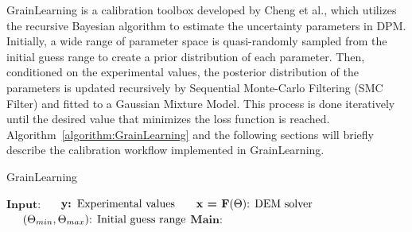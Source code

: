 GrainLearning is a calibration toolbox developed by Cheng et al., which utilizes the recursive Bayesian algorithm to estimate the uncertainty parameters in DPM. Initially, a wide range of parameter space is quasi-randomly sampled from the initial guess range to create a prior distribution of each parameter. Then, conditioned on the experimental values, the posterior distribution of the parameters is updated recursively by Sequential Monte-Carlo Filtering (SMC Filter) and fitted to a Gaussian Mixture Model. This process is done iteratively until the desired value that minimizes the loss function is reached. Algorithm~\ref{algorithm:GrainLearning} and the following sections will briefly describe the calibration workflow implemented in GrainLearning. 

\begin{algorithm}
    \caption{GrainLearning}\label{algorithm:GrainLearning}
    \begin{algorithmic}
        \State$\textbf{Input:}$
        \State$\hspace*{5mm}\text{\textbf{y: }} \text{Experimental values} $
        \State$\hspace*{5mm} \textbf{x = F$(\Theta)$} \text{: DEM solver}$
        \State$\hspace*{5mm}(\Theta_{min}, \Theta_{max}) \text{: Initial guess range} $
        \State$\textbf{Main:}$


\end{algorithmic}
\end{algorithm}
